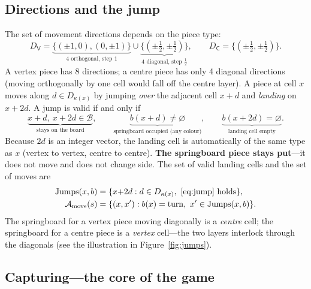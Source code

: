 \subsection{Directions and the jump}
\label{ssec:action}

The set of movement directions depends on the piece type:
\begin{equation}
D_{\mathsf V} = \underbrace{\{(\pm1,0),(0,\pm1)\}}_{\text{4 orthogonal, step }1}
  \cup \underbrace{\{(\pm\tfrac12,\pm\tfrac12)\}}_{\text{4 diagonal, step }\frac12},
\qquad
D_{\mathsf C} = \{(\pm\tfrac12,\pm\tfrac12)\}.
\label{eq:dirs}
\end{equation}
A vertex piece has 8 directions; a centre piece has only 4 diagonal
directions (moving orthogonally by one cell would fall off the centre
layer). A piece at cell $x$ moves along $d\in D_{\kappa(x)}$ by jumping
\emph{over} the adjacent cell $x+d$ and \emph{landing} on $x+2d$. A jump is
valid if and only if
\begin{equation}
\underbrace{x{+}d,\ x{+}2d\in\mathcal B}_{\text{stays on the board}},
\qquad
\underbrace{b(x{+}d)\neq\varnothing}_{\text{springboard occupied (any colour)}},
\qquad
\underbrace{b(x{+}2d)=\varnothing}_{\text{landing cell empty}}.
\label{eq:jump}
\end{equation}
Because $2d$ is an integer vector, the landing cell is automatically of the
same type as $x$ (vertex to vertex, centre to centre). \textbf{The
springboard piece stays put}---it does not move and does not change side.
The set of valid landing cells and the set of moves are
\begin{equation}
\begin{aligned}
\mathrm{Jumps}(x,b)&=\{x{+}2d : d\in D_{\kappa(x)},\ \eqref{eq:jump}\ \text{holds}\},\\
\mathcal A_{\mathrm{move}}(s)&=\{(x,x') : b(x)=\mathrm{turn},\ x'\in\mathrm{Jumps}(x,b)\}.
\end{aligned}
\label{eq:moves}
\end{equation}
The springboard for a vertex piece moving diagonally is a \emph{centre}
cell; the springboard for a centre piece is a \emph{vertex} cell---the two
layers interlock through the diagonals (see the illustration in
Figure~\ref{fig:jumps}).

\subsection{Capturing---the core of the game}
\label{ssec:capture}

